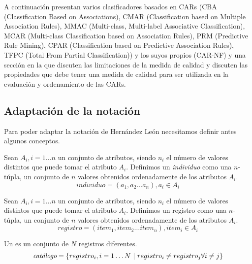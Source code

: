 A continuación presentan varios clasificadores basados en CARs (CBA (Classification Based on Associations), CMAR (Classification based on Multiple Association Rules), MMAC (Multi-class, Multi-label Associative Classification), MCAR (Multi-class Classification
based on Association Rules), PRM (Predictive Rule Mining), CPAR (Classification based on Predictive Association Rules), TFPC (Total From Partial Classification)) y los suyos propios (CAR-NF) y una sección en la que discuten las limitaciones de la medida de calidad \Confianza y discuten las propiedades que debe tener una medida de calidad para ser utilizada en la evaluación y ordenamiento de las CARs.










\subsection{Adaptación de la notación}
\label{sec:clasificacion:conceptos-basicos:tal}
%
Para poder adaptar la notación de Hernández León necesitamos definir antes algunos conceptos.

\begin{Definition}[Individuo]
   Sean $A_i, i = 1 \ldots n$ un conjunto de atributos, siendo $n_i$ el número de valores distintos que puede tomar el atributo $A_i$. Definimos un \emph{individuo} como una $n$-túpla, un conjunto de $n$ valores obtenidos ordenadamente de los atributos $A_i$.
   $$individuo = \left(a_1, a_2\ldots a_n\right), a_i \in A_i$$
\label{def:individuo}
\end{Definition}


\begin{Definition}[Registro]
   Sean $A_i, i = 1 \ldots n$ un conjunto de atributos, siendo $n_i$ el número de valores distintos que puede tomar el atributo $A_i$. Definimos un registro como una $n$-túpla, un conjunto de $n$ valores obtenidos ordenadamente de los atributos $A_i$.
   $$registro = \left(item_1, item_2\ldots item_n\right), item_i \in A_i$$
\label{def:registro}
\end{Definition}

\begin{Definition}[\Catalogo] Un \catalogo es un conjunto de $N$ registros diferentes.
   $$\catalogo = \left\{registro_i, i = 1\ldots N\ | \ registro_i \neq registro_j \forall i \neq j\right\}$$
\label{def:catalogo}
\end{Definition}
